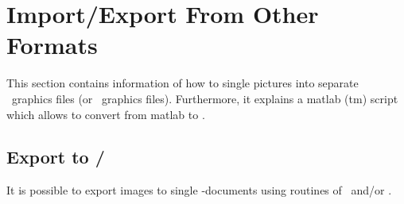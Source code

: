 \section{Import/Export From Other Formats}
\label{sec:pgfplots:importexport}
This section contains information of how to single pictures into separate \pdf\ graphics files (or \eps\ graphics files). Furthermore, it explains a matlab (tm) script which allows to convert from matlab to \PGFPlots.

\subsection[Export to pdf/eps]{Export to {\normalfont\pdf/\eps}}
\label{sec:pgfplots:export}
It is possible to export images to single \pdf-documents using routines of \pgfname\ and/or \Tikz.

